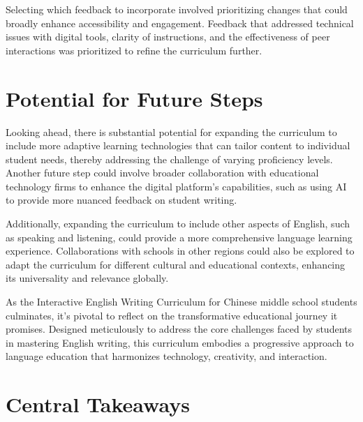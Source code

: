 \documentclass[11pt]{article}
\begin{document}
Selecting which feedback to incorporate involved prioritizing changes that could broadly enhance accessibility and engagement. Feedback that addressed technical issues with digital tools, clarity of instructions, and the effectiveness of peer interactions was prioritized to refine the curriculum further.

\section{Potential for Future Steps}

Looking ahead, there is substantial potential for expanding the curriculum to include more adaptive learning technologies that can tailor content to individual student needs, thereby addressing the challenge of varying proficiency levels. Another future step could involve broader collaboration with educational technology firms to enhance the digital platform’s capabilities, such as using AI to provide more nuanced feedback on student writing.

Additionally, expanding the curriculum to include other aspects of English, such as speaking and listening, could provide a more comprehensive language learning experience. Collaborations with schools in other regions could also be explored to adapt the curriculum for different cultural and educational contexts, enhancing its universality and relevance globally.

As the Interactive English Writing Curriculum for Chinese middle school students culminates, it's pivotal to reflect on the transformative educational journey it promises. Designed meticulously to address the core challenges faced by students in mastering English writing, this curriculum embodies a progressive approach to language education that harmonizes technology, creativity, and interaction.

\section{Central Takeaways}
\end{document}
